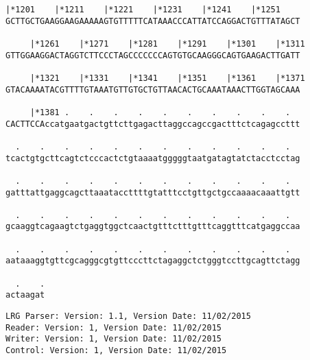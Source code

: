\documentclass{article}
\begin{document}
\begin{Verbatim}[fontfamily=courier]
     |*1201    |*1211    |*1221    |*1231    |*1241    |*1251
GCTTGCTGAAGGAAGAAAAAGTGTTTTTCATAAACCCATTATCCAGGACTGTTTATAGCT

     |*1261    |*1271    |*1281    |*1291    |*1301    |*1311
GTTGGAAGGACTAGGTCTTCCCTAGCCCCCCCAGTGTGCAAGGGCAGTGAAGACTTGATT

     |*1321    |*1331    |*1341    |*1351    |*1361    |*1371
GTACAAAATACGTTTTGTAAATGTTGTGCTGTTAACACTGCAAATAAACTTGGTAGCAAA

     |*1381 .    .    .    .    .    .    .    .    .    .  
CACTTCCAccatgaatgactgttcttgagacttaggccagccgactttctcagagccttt

  .    .    .    .    .    .    .    .    .    .    .    .  
tcactgtgcttcagtctcccactctgtaaaatgggggtaatgatagtatctacctcctag

  .    .    .    .    .    .    .    .    .    .    .    .  
gatttattgaggcagcttaaataccttttgtatttcctgttgctgccaaaacaaattgtt

  .    .    .    .    .    .    .    .    .    .    .    .  
gcaaggtcagaagtctgaggtggctcaactgtttctttgtttcaggtttcatgaggccaa

  .    .    .    .    .    .    .    .    .    .    .    .  
aataaaggtgttcgcagggcgtgttcccttctagaggctctgggtccttgcagttctagg

  .    .
actaagat
\end{Verbatim}
\newpage
\begin{Verbatim}[fontfamily=courier]
LRG Parser: Version: 1.1, Version Date: 11/02/2015
Reader: Version: 1, Version Date: 11/02/2015
Writer: Version: 1, Version Date: 11/02/2015
Control: Version: 1, Version Date: 11/02/2015
\end{Verbatim}
\end{document}
